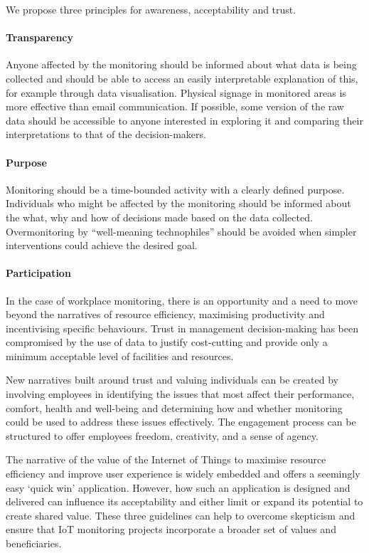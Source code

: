 We propose three principles for awareness, acceptability and trust.

\paragraph{Transparency} Anyone affected by the monitoring should be
informed about what data is being collected and should be able to
access an easily interpretable explanation of this, for example
through data visualisation. Physical signage in monitored areas is
more effective than email communication. If possible, some version of
the raw data should be accessible to anyone interested in exploring it
and comparing their interpretations to that of the decision-makers. 

\paragraph{Purpose} Monitoring should be a time-bounded activity with
a clearly defined purpose. Individuals who might be affected by the
monitoring should be informed about the what, why and how of decisions
made based on the data collected. Overmonitoring by “well-meaning
technophiles” should be avoided when simpler interventions could
achieve the desired goal. 

\paragraph{Participation} In the case of workplace monitoring, there
is an opportunity and a need to move beyond the narratives of resource
efficiency, maximising productivity and incentivising specific
behaviours. Trust in management decision-making has been compromised
by the use of data to justify cost-cutting and provide only a minimum
acceptable level of facilities and resources. 

New narratives built around trust and valuing individuals can be
created by involving employees in identifying the issues that most
affect their performance, comfort, health and well-being and
determining how and whether monitoring could be used to address these
issues effectively. The engagement process can be structured to offer
employees freedom, creativity, and a sense of agency. 

The narrative of the value of the Internet of Things to maximise
resource efficiency and improve user experience is widely embedded and
offers a seemingly easy ‘quick win’ application. However, how such an
application is designed and delivered can influence its acceptability
and either limit or expand its potential to create shared value. These
three guidelines can help to overcome skepticism and ensure that IoT
monitoring projects incorporate a broader set of values and
beneficiaries. 

